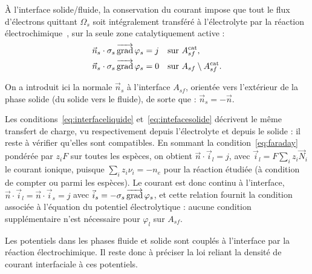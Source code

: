 À l'interface solide/fluide, la conservation du courant
impose que tout le flux d'électrons quittant $\Omega_s$
soit intégralement transféré à l'électrolyte par la réaction
électrochimique~\cite{devidtsGoverningEquationsTransport1997}, sur la seule zone catalytiquement active :
\begin{subequations}
\begin{align}
\vec{n}_s \cdot \sigma_s \mathop{\overrightarrow{\operatorname{grad}}}\nolimits \varphi_s &= j && \text{sur } A_{sf}^{\mathrm{cat}}, \\
\vec{n}_s \cdot \sigma_s \mathop{\overrightarrow{\operatorname{grad}}}\nolimits \varphi_s &= 0 && \text{sur } A_{sf} \setminus A_{sf}^{\mathrm{cat}}.
\end{align}
\label{eq:intefacesolide}
\end{subequations}

On a introduit ici la normale $\vec{n}_s$ à l'interface $A_{sf}$, orientée vers
l'extérieur de la phase solide (du solide vers le fluide), de sorte que :
$\vec{n}_s = -\vec{n}$.

Les conditions~\eqref{eq:interfaceliquide} et~\eqref{eq:intefacesolide} décrivent le
même transfert de charge, vu respectivement depuis l'électrolyte et depuis le
solide : il reste à vérifier qu'elles sont compatibles. En sommant la
condition~\eqref{eq:faraday} pondérée par $z_iF$ sur toutes les espèces, on
obtient $\vec{n}\cdot\vec{i}_l = j$, avec $\vec{i}_l = F\sum_i z_i\vec{N}_i$ le
courant ionique, puisque $\sum_i z_i\nu_i = -n_e$ pour la réaction étudiée
(à condition de compter  ou  parmi les espèces). Le courant est
donc continu à l'interface, $\vec{n}\cdot\vec{i}_l = \vec{n}\cdot\vec{i}_s = j$
avec $\vec{i}_s = -\sigma_s\mathop{\overrightarrow{\operatorname{grad}}}\nolimits\varphi_s$, et cette relation fournit la
condition associée à l'équation du potentiel électrolytique : aucune condition
supplémentaire n'est nécessaire pour $\varphi_l$ sur $A_{sf}$.

Les potentiels dans les phases fluide et solide sont couplés à
l'interface par la réaction électrochimique. Il reste donc à préciser
la loi reliant la densité de courant interfaciale à ces potentiels.

